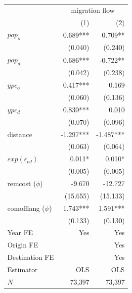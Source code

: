 \documentclass[letterpaper,11pt]{article}
\begin{document}
\begin{table}[H]
	\centering
	\begin{threeparttable}
		\begin{tabular}{lrr}
		\toprule
		                & \multicolumn{2}{c}{migration flow} \\
		\cmidrule(lr){2-3}
		                &       (1) &                       (2) \\
		\midrule
		$pop_o$        &  0.689*** &                   0.709** \\
		                &   (0.040) &                   (0.240) \\
		$pop_d$        &  0.686*** &                  -0.722** \\
		                &   (0.042) &                   (0.238) \\
		$ypc_o$        &  0.417*** &                     0.169 \\
		                &   (0.060) &                   (0.136) \\
		$ypc_d$        &  0.830*** &                     0.010 \\
		                &   (0.070) &                   (0.096) \\
		distance        & -1.297*** &                 -1.487*** \\
		                &   (0.063) &                   (0.064) \\
		$exp(\epsilon_{od})$    &    0.011* &                    0.010* \\
		                &   (0.005) &                   (0.005) \\
		remcost  ($\phi$)      &    -9.670 &                   -12.727 \\
		                &  (15.655) &                  (15.133) \\
		comofflang ($\psi$)    &  1.743*** &                  1.591*** \\
		                &   (0.133) &                   (0.130) \\
		\midrule
		Year FE &       Yes &                       Yes \\
		Origin FE &           &                       Yes \\
		Destination FE &           &                       Yes \\
		\midrule
		Estimator       &       OLS &                       OLS \\
		\midrule
		$N$             &    73,397 &                    73,397 \\

\end{tabular}
\end{threeparttable}
\end{table}
\end{document}
